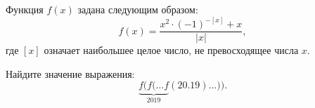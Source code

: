 
Функция $f(x)$ задана следующим образом:
$$f(x)=\dfrac{x^2\cdot(-1)^{-[x]}+x}{|x|},
$$
где $[x]$ означает наибольшее целое число, не превосходящее числа $x$.

Найдите значение выражения: 
$$
\underbrace{f(f(\ldots f}_{2019}(20.19)\ldots )).
$$